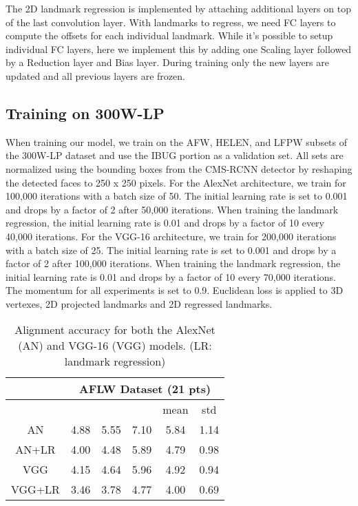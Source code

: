 \documentclass[10pt,twocolumn,letterpaper]{article}
\begin{document}
The 2D landmark regression is implemented by attaching additional layers on top of the last convolution layer. With  landmarks to regress, we need  FC layers to compute the offsets for each individual landmark. While it's possible to setup  individual FC layers, here we implement this by adding one Scaling layer followed by a Reduction layer and Bias layer. During training only the new layers are updated and all previous layers are frozen.

\subsection{Training on 300W-LP}
When training our model, we train on the AFW, HELEN, and LFPW subsets of the 300W-LP dataset and use the IBUG portion as a validation set. All sets are normalized using the bounding boxes from the CMS-RCNN detector by reshaping the detected faces to 250 x 250 pixels.
For the AlexNet architecture, we train for 100,000 iterations with a batch size of 50. The initial learning rate is set to 0.001 and drops by a factor of 2 after 50,000 iterations. When training the landmark regression, the initial learning rate is 0.01 and drops by a factor of 10 every 40,000 iterations. 
For the VGG-16 architecture, we train for 200,000 iterations with a batch size of 25. The initial learning rate is set to 0.001 and drops by a factor of 2 after 100,000 iterations. When training the landmark regression, the initial learning rate is 0.01 and drops by a factor of 10 every 70,000 iterations. 
The momentum for all experiments is set to 0.9. Euclidean loss is applied to 3D vertexes, 2D projected landmarks and 2D regressed landmarks.


\begin{table}[t!]
\centering
\caption{Alignment accuracy for both the AlexNet (AN) and VGG-16 (VGG) models. (LR: landmark regression)}
\label{tab:ablation}
\begin{tabular}{|c||c|c|c|c|c|}
\hline
 & \multicolumn{5}{c|}{AFLW Dataset (21 pts)} \\ \hline
 &  &  &  & mean & std \\ \hline \hline
AN & 4.88 & 5.55 & 7.10 & 5.84 & 1.14 \\ \hline
AN+LR & 4.00 & 4.48 & 5.89 & 4.79 & 0.98 \\ \hline \hline
VGG & 4.15 & 4.64 & 5.96 & 4.92 & 0.94 \\ \hline
VGG+LR & 3.46 & 3.78 & 4.77 & 4.00 & 0.69 \\ \hline
\end{tabular}
\end{table}
\end{document}
